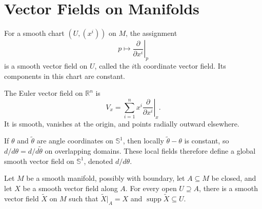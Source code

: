 
\section{Vector Fields on Manifolds}

\begin{example}
\label{ex:8-2}
\leanok
{}
For a smooth chart $(U,(x^i))$ on $M$, the assignment
\[
p\longmapsto \left.\frac{\partial}{\partial x^i}\right|_p
\]
is a smooth vector field on $U$, called the $i$th coordinate vector field. Its
components in this chart are constant.
\end{example}

\begin{example}
\label{ex:8-3}
\leanok
{}
The Euler vector field on $\mathbb{R}^n$ is
\[
V_x=\sum_{i=1}^n x^i\left.\frac{\partial}{\partial x^i}\right|_x.
\]
It is smooth, vanishes at the origin, and points radially outward elsewhere.
\end{example}

\begin{example}
\label{ex:8-4}
\leanok
{}
If $\theta$ and $\widetilde\theta$ are angle coordinates on $\mathbb{S}^1$,
then locally $\widetilde\theta-\theta$ is constant, so
$d/d\theta=d/d\widetilde\theta$ on overlapping domains. These local fields
therefore define a global smooth vector field on $\mathbb{S}^1$, denoted
$d/d\theta$.
\end{example}

\begin{lemma}
\label{lem:8-6}
\leanok
{}
Let $M$ be a smooth manifold, possibly with boundary, let $A\subseteq M$ be
closed, and let $X$ be a smooth vector field along $A$. For every open
$U\supseteq A$, there is a smooth vector field $\widetilde X$ on $M$ such that
$\widetilde X|_A=X$ and $\operatorname{supp}\widetilde X\subseteq U$.
\end{lemma}

